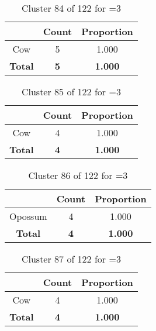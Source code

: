 \begin{table}[ht!]
\centering
\begin{tabular}{|c|c|c|}
\hline
\bf \Spec{} &\bf Count &\bf Proportion\\ \hline \hline
Cow & 5 & 1.000\\ \hline
\hline
\bf Total & \bf 5 & \bf 1.000\\ \hline
\end{tabular}
\label{tab:cluster:84:3}
\caption{Cluster 84 of 122 for \minneigh{}=3}
\end{table}

\begin{table}[ht!]
\centering
\begin{tabular}{|c|c|c|}
\hline
\bf \Spec{} &\bf Count &\bf Proportion\\ \hline \hline
Cow & 4 & 1.000\\ \hline
\hline
\bf Total & \bf 4 & \bf 1.000\\ \hline
\end{tabular}
\label{tab:cluster:85:3}
\caption{Cluster 85 of 122 for \minneigh{}=3}
\end{table}

\begin{table}[ht!]
\centering
\begin{tabular}{|c|c|c|}
\hline
\bf \Spec{} &\bf Count &\bf Proportion\\ \hline \hline
Opossum & 4 & 1.000\\ \hline
\hline
\bf Total & \bf 4 & \bf 1.000\\ \hline
\end{tabular}
\label{tab:cluster:86:3}
\caption{Cluster 86 of 122 for \minneigh{}=3}
\end{table}

\begin{table}[ht!]
\centering
\begin{tabular}{|c|c|c|}
\hline
\bf \Spec{} &\bf Count &\bf Proportion\\ \hline \hline
Cow & 4 & 1.000\\ \hline
\hline
\bf Total & \bf 4 & \bf 1.000\\ \hline
\end{tabular}
\label{tab:cluster:87:3}
\caption{Cluster 87 of 122 for \minneigh{}=3}
\end{table}

